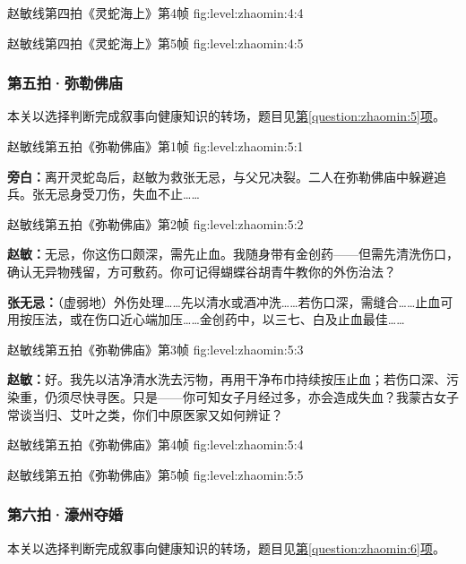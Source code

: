 \clearpage

  {赵敏线第四拍《灵蛇海上》第4帧}
  {fig:level:zhaomin:4:4}
  {\scriptsize}
  {\mbox{}}

  {赵敏线第四拍《灵蛇海上》第5帧}
  {fig:level:zhaomin:4:5}
  {\scriptsize}
  {\mbox{}}

\subsubsection{第五拍·弥勒佛庙}\label{plot:zhaomin:5}
本关以选择判断完成叙事向健康知识的转场，题目见\hyperref[question:zhaomin:5]{第\ref*{question:zhaomin:5}项}。

  {赵敏线第五拍《弥勒佛庙》第1帧}
  {fig:level:zhaomin:5:1}
  {\scriptsize}
  {\textbf{旁白：}离开灵蛇岛后，赵敏为救张无忌，与父兄决裂。二人在弥勒佛庙中躲避追兵。张无忌身受刀伤，失血不止……\par}

\clearpage

  {赵敏线第五拍《弥勒佛庙》第2帧}
  {fig:level:zhaomin:5:2}
  {\scriptsize}
  {\textbf{赵敏：}无忌，你这伤口颇深，需先止血。我随身带有金创药——但需先清洗伤口，确认无异物残留，方可敷药。你可记得蝴蝶谷胡青牛教你的外伤治法？\par
\textbf{张无忌：}（虚弱地）外伤处理……先以清水或酒冲洗……若伤口深，需缝合……止血可用按压法，或在伤口近心端加压……金创药中，以三七、白及止血最佳……\par}

  {赵敏线第五拍《弥勒佛庙》第3帧}
  {fig:level:zhaomin:5:3}
  {\scriptsize}
  {\textbf{赵敏：}好。我先以洁净清水洗去污物，再用干净布巾持续按压止血；若伤口深、污染重，仍须尽快寻医。只是——你可知女子月经过多，亦会造成失血？我蒙古女子常谈当归、艾叶之类，你们中原医家又如何辨证？\par}

  {赵敏线第五拍《弥勒佛庙》第4帧}
  {fig:level:zhaomin:5:4}
  {\scriptsize}
  {\mbox{}}

\clearpage

  {赵敏线第五拍《弥勒佛庙》第5帧}
  {fig:level:zhaomin:5:5}
  {\scriptsize}
  {\mbox{}}

\subsubsection{第六拍·濠州夺婚}\label{plot:zhaomin:6}
本关以选择判断完成叙事向健康知识的转场，题目见\hyperref[question:zhaomin:6]{第\ref*{question:zhaomin:6}项}。

